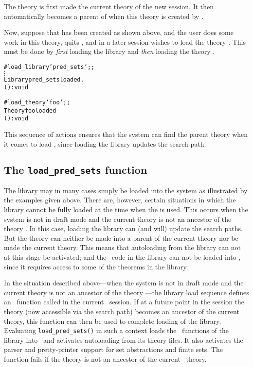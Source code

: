 \noindent The theory  is first made the current theory of the
new session.  It then automatically becomes a parent of  when this
theory is created by .

Now, suppose that  has been created as shown above, and the user does
some work in this theory, quits \HOL, and in a later session wishes to load the
theory .  This must be done by {\it first\/} loading the
 library and {\it then\/} loading the theory .

\setcounter{sessioncount}{1}
\begin{session}
\begin{alltt}
#load_library `pred_sets`;;
  \(\vdots\)
Library pred_sets loaded.
() : void

#load_theory `foo`;;
Theory foo loaded
() : void
\end{alltt}\end{session}

\noindent This sequence of actions ensures that the system can find the parent
theory  when it comes to load , since loading the
library updates the search path.

\subsection{The {\tt load\_pred\_sets} function}%

The  library may in many cases simply be loaded into the system
as illustrated by the examples given above.  There are, however, certain
situations in which the library cannot be fully loaded at the time when the
 is used.  This occurs when the system is not in draft mode
and the current theory is not an ancestor of the theory .  In
this case, loading the library can (and will) update the search paths.  But the
theory  can neither be made into a parent of the current theory
nor be made the current theory.  This means that autoloading from the library
can not at this stage be activated; and the \ML\ code in the library can not be
loaded into \HOL, since it requires access to some of the theorems in the
library.

In the situation described above---when the system is not in draft mode and the
current theory is not an ancestor of the theory ---the library
load sequence defines an \ML\ function called  in the
current \HOL\ session.  If at a future point in the session the 
theory (now accessible via the search path) becomes an ancestor of the current
theory, this function can then be used to complete loading of the library.
Evaluating {\small\verb!load_pred_sets()!} in such a context loads the \ML\
functions of the  library into \HOL\ and activates autoloading
from its theory files.  It also activates the parser and pretty-printer support
for set abstractions and finite sets.  The function \ml{load\_pred\_sets} fails
if the theory \ml{pred\_sets} is not an ancestor of the current \HOL\ theory.

